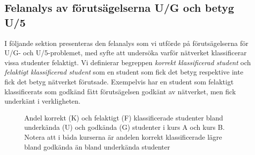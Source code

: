 



\subsection{Felanalys av förutsägelserna U/G och betyg U/5}
\label{sec:error_analysis}

I följande sektion presenteras den felanalys som vi utförde på förutsägelserna för U/G- och U/5-problemet, med syfte att undersöka varför nätverket klassificerar vissa studenter felaktigt. Vi definierar begreppen \emph{korrekt klassificerad student} och \emph{felaktigt klassificerad student} som en student som fick det betyg respektive inte fick det betyg nätverket förutsade. Exempelvis har en student som felaktigt klassificerats som godkänd fått förutsägelsen godkänt av nätverket, men fick underkänt i verkligheten.

\begin{figure}[hbtp]
    \centering
    \subfloat[Kurs A]{\resizebox {0.49\textwidth}{!}{%
        }\label{fig:gu_ffm521}
    }
    \hfill
    \subfloat[Kurs B]{\resizebox{0.49\textwidth}{!}{%
        }\label{fig:gu_ffm234}
    }
    \caption{Andel korrekt (K) och felaktigt (F) klassificerade studenter bland underkända (U) och godkända (G) studenter i kurs A och kurs B. Notera att i båda kurserna är andelen korrekt klassificerade lägre bland godkända än bland underkända studenter}
    \label{fig:gu_ffm521_ffm234}
\end{figure}

